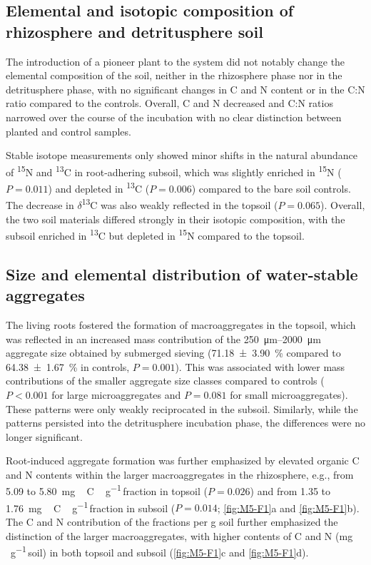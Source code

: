 \subsection{Elemental and isotopic composition of rhizosphere and detritusphere soil}

The introduction of a pioneer plant to the system did not notably change the elemental composition of the soil, neither in the rhizosphere phase nor in the detritusphere phase, with no significant changes in C and N content or in the C:N ratio compared to the controls. Overall, C and N decreased and C:N ratios narrowed over the course of the incubation with no clear distinction between planted and control samples.

Stable isotope measurements only showed minor shifts in the natural abundance of \textsuperscript{15}N and \textsuperscript{13}C in root-adhering subsoil, which was slightly enriched in \textsuperscript{15}N (\(P=0.011\)) and depleted in \textsuperscript{13}C (\(P=0.006\)) compared to the bare soil controls. The decrease in \(\delta\)\textsuperscript{13}C was also weakly reflected in the topsoil (\(P=0.065\)). Overall, the two soil materials differed strongly in their isotopic composition, with the subsoil enriched in \textsuperscript{13}C but depleted in \textsuperscript{15}N compared to the topsoil.


\subsection{Size and elemental distribution of water-stable aggregates}

The living roots fostered the formation of macroaggregates in the topsoil, which was reflected in an increased mass contribution of the \SIrange{250}{2000}{\micro\metre} aggregate size obtained by submerged sieving (\SI{71.18 \pm 3.90}{\percent} compared to \SI{64.38 \pm 1.67}{\percent} in controls, \(P=0.001\)). This was associated with lower mass contributions of the smaller aggregate size classes compared to controls (\(P < 0.001\) for large microaggregates and \(P=0.081\) for small microaggregates). These patterns were only weakly reciprocated in the subsoil. Similarly, while the patterns persisted into the detritusphere incubation phase, the differences were no longer significant.

Root-induced aggregate formation was further emphasized by elevated organic C and N contents within the larger macroaggregates in the rhizosphere, e.g., from \num{5.09} to \SI{5.80}{mg\,C\,\gram^{-1}}\,fraction in topsoil (\(P=0.026\)) and from \num{1.35} to \SI{1.76}{mg\,C\,\gram^{-1}}\,fraction in subsoil (\(P=0.014\); \ref{fig:M5-F1}a and \ref{fig:M5-F1}b). The C and N contribution of the fractions per g soil further emphasized the distinction of the larger macroaggregates, with higher contents of C and N (\si{mg\,\gram^{-1}}\,soil) in both topsoil and subsoil (\ref{fig:M5-F1}c and \ref{fig:M5-F1}d). 

